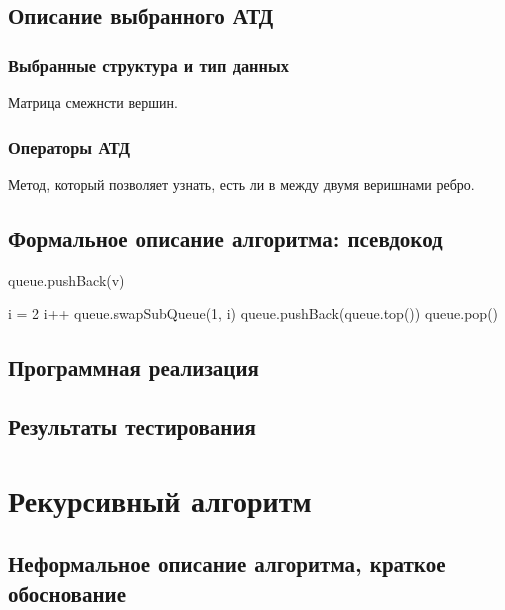 \subsection{Описание выбранного АТД}
\subsubsection{Выбранные структура и тип данных}
Матрица смежнсти вершин.
\subsubsection{Операторы АТД}
Метод, который позволяет узнать, есть ли в между двумя веришнами ребро.

\subsection{Формальное описание алгоритма: псевдокод}
\begin{algorithmic}[1]

\State queue.pushBack(v)
\EndFor


    \State i = 2
    \State  {}
            \State i++
            \EndWhile
    \State queue.swapSubQueue(1, i)
\EndIf
queue.pushBack(queue.top())
queue.pop()
\EndFor
\EndProcedure
\end{algorithmic}

\subsection{Программная реализация}


\subsection{Результаты тестирования}

\section{Рекурсивный алгоритм}

\subsection{Неформальное описание алгоритма, краткое обоснование}

